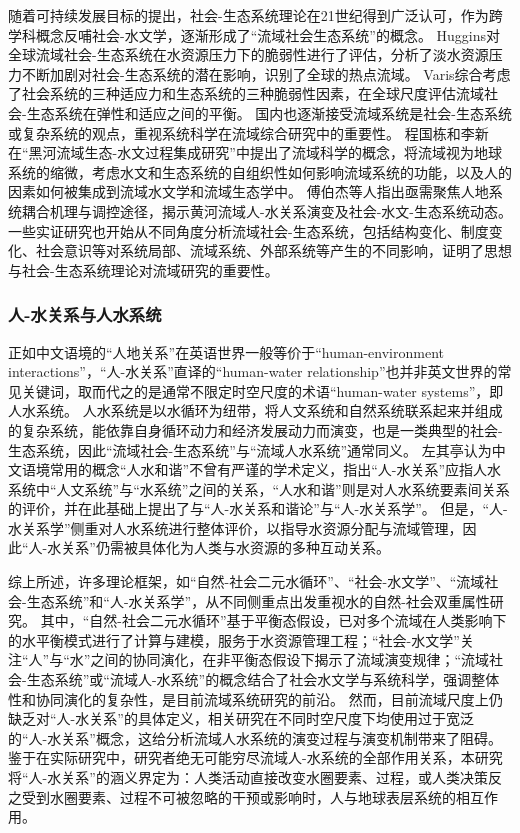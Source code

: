 随着可持续发展目标的提出，社会-生态系统理论在21世纪得到广泛认可，作为跨学科概念反哺社会-水文学，逐渐形成了“流域社会生态系统”的概念。
Huggins对全球流域社会-生态系统在水资源压力下的脆弱性进行了评估，分析了淡水资源压力不断加剧对社会-生态系统的潜在影响，识别了全球的热点流域\cite{huggins2022}。
Varis综合考虑了社会系统的三种适应力和生态系统的三种脆弱性因素，在全球尺度评估流域社会-生态系统在弹性和适应之间的平衡\cite{varis2019}。
国内也逐渐接受流域系统是社会-生态系统或复杂系统的观点，重视系统科学在流域综合研究中的重要性。
程国栋和李新在“黑河流域生态-水文过程集成研究”中提出了流域科学的概念，将流域视为地球系统的缩微，考虑水文和生态系统的自组织性如何影响流域系统的功能，以及人的因素如何被集成到流域水文学和流域生态学中\cite{cheng2015}。
傅伯杰等人指出亟需聚焦人地系统耦合机理与调控途径，揭示黄河流域人-水关系演变及社会-水文-生态系统动态\cite{fu2021a}。
一些实证研究也开始从不同角度分析流域社会-生态系统，包括结构变化\cite{song2022}、制度变化\cite{wang2019d}、社会意识\cite{liu2023}等对系统局部、流域系统、外部系统等产生的不同影响，证明了思想与社会-生态系统理论对流域研究的重要性。

\subsubsection{人-水关系与人水系统}

正如中文语境的“人地关系”在英语世界一般等价于“human-environment interactions”\cite{li2016c, liu2023}，“人-水关系”直译的“human-water relationship”也并非英文世界的常见关键词，取而代之的是通常不限定时空尺度的术语“human-water systems”，即人水系统\cite{konar2019}。
人水系统是以水循环为纽带，将人文系统和自然系统联系起来并组成的复杂系统，能依靠自身循环动力和经济发展动力而演变\cite{zuo2007}，也是一类典型的社会-生态系统，因此“流域社会-生态系统”与“流域人水系统”通常同义\cite{yu2020}。
左其亭认为中文语境常用的概念“人水和谐”不曾有严谨的学术定义\cite{zuo2007}，指出“人-水关系”应指人水系统中“人文系统”与“水系统”之间的关系，“人水和谐”则是对人水系统要素间关系的评价，并在此基础上提出了与“人-水关系和谐论”与“人-水关系学”\cite{zuoqiting2022, zuo2016a}。
但是，“人-水关系学”侧重对人水系统进行整体评价，以指导水资源分配与流域管理，因此“人-水关系”仍需被具体化为人类与水资源的多种互动关系\cite{zuo2016, zuo2020a}。

综上所述，许多理论框架，如“自然-社会二元水循环”、“社会-水文学”、“流域社会-生态系统”和“人-水关系学”，从不同侧重点出发重视水的自然-社会双重属性研究。
其中，“自然-社会二元水循环”基于平衡态假设，已对多个流域在人类影响下的水平衡模式进行了计算与建模，服务于水资源管理工程；“社会-水文学”关注“人”与“水”之间的协同演化，在非平衡态假设下揭示了流域演变规律；“流域社会-生态系统”或“流域人-水系统”的概念结合了社会水文学与系统科学，强调整体性和协同演化的复杂性，是目前流域系统研究的前沿。
然而，目前流域尺度上仍缺乏对“人-水关系”的具体定义，相关研究在不同时空尺度下均使用过于宽泛的“人-水关系”概念，这给分析流域人水系统的演变过程与演变机制带来了阻碍。
鉴于在实际研究中，研究者绝无可能穷尽流域人-水系统的全部作用关系，本研究将“人-水关系”的涵义界定为：人类活动直接改变水圈要素、过程，或人类决策反之受到水圈要素、过程不可被忽略的干预或影响时，人与地球表层系统的相互作用。
